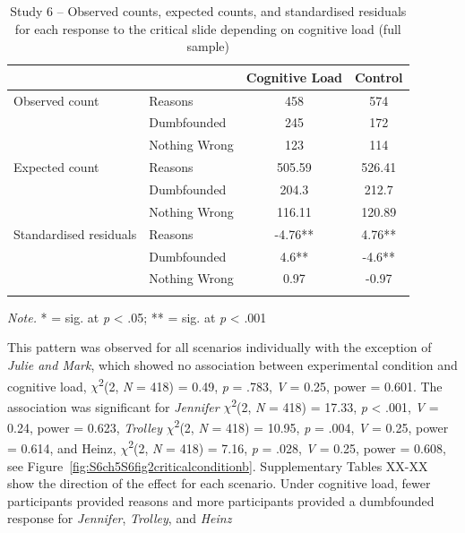\documentclass[
  american,
  man]{apa7}
\begin{document}
\begin{table}[tbp]

\begin{center}
\begin{threeparttable}

\caption{\label{tab:S6tab1dumb}Study 6 – Observed counts, expected counts, and standardised residuals for each response to the critical slide depending on cognitive load (full sample)}

\begin{tabular}{llcc}
\toprule
 & \multicolumn{1}{c}{} & \multicolumn{1}{c}{Cognitive Load} & \multicolumn{1}{c}{Control}\\
\midrule
Observed count & Reasons & 458 & 574\\
 & Dumbfounded & 245 & 172\\
 & Nothing Wrong & 123 & 114\\
Expected count & Reasons & 505.59 & 526.41\\
 & Dumbfounded & 204.3 & 212.7\\
 & Nothing Wrong & 116.11 & 120.89\\
Standardised residuals & Reasons & -4.76** & 4.76**\\
 & Dumbfounded & 4.6** & -4.6**\\
 & Nothing Wrong & 0.97 & -0.97\\
\bottomrule
\addlinespace
\end{tabular}

\begin{tablenotes}[para]
\normalsize{\textit{Note.} * = sig. at \emph{p} < .05; ** = sig. at \emph{p} < .001}
\end{tablenotes}

\end{threeparttable}
\end{center}

\end{table}

\newpage

This pattern was observed for all scenarios individually with the exception of \emph{Julie and Mark}, which showed no association between experimental condition and cognitive load, \(\chi\)\textsuperscript{2}(2, \emph{N} = 418) = 0.49, \emph{p} = .783, \emph{V} = 0.25, power = 0.601. The association was significant for \emph{Jennifer} \(\chi\)\textsuperscript{2}(2, \emph{N} = 418) = 17.33, \emph{p} \textless{} .001, \emph{V} = 0.24, power = 0.623, \emph{Trolley} \(\chi\)\textsuperscript{2}(2, \emph{N} = 418) = 10.95, \emph{p} = .004, \emph{V} = 0.25, power = 0.614, and Heinz, \(\chi\)\textsuperscript{2}(2, \emph{N} = 418) = 7.16, \emph{p} = .028, \emph{V} = 0.25, power = 0.608, see Figure~\ref{fig:S6ch5S6fig2criticalconditionb}. Supplementary Tables XX-XX show the direction of the effect for each scenario. Under cognitive load, fewer participants provided reasons and more participants provided a dumbfounded response for \emph{Jennifer}, \emph{Trolley}, and \emph{Heinz}
\end{document}
